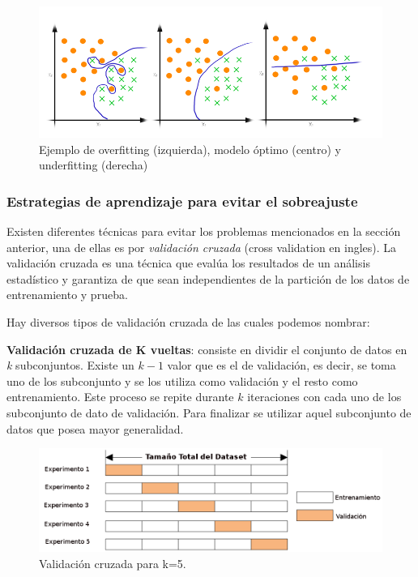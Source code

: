 \begin{figure}[h]
 \centering
  \includegraphics[scale=0.4,keepaspectratio=true,clip=true]{imagenes/MarcoTeorico/OverFUnderF.png}
  \caption{Ejemplo de overfitting (izquierda), modelo óptimo (centro) y underfitting (derecha) }%
	\label{Fig: overUnder}
\end{figure}



\subsubsection{Estrategias de aprendizaje para evitar el sobreajuste}

Existen diferentes técnicas para evitar los problemas mencionados en la sección anterior, una de ellas es por  \textit{validación cruzada} (cross validation en ingles). La validación cruzada es una técnica que evalúa los resultados de un análisis estadístico y garantiza de que sean independientes de la partición de los datos de entrenamiento y prueba. 

Hay diversos tipos de validación cruzada de las cuales podemos nombrar:


\par \textbf{Validación cruzada de K vueltas}: consiste en dividir el conjunto de datos en \textit{k} subconjuntos. Existe un $k-1 $ valor que es el de validación, es decir, se toma uno de los subconjunto y se los utiliza como validación y el resto como entrenamiento.  Este proceso se repite durante $k $ iteraciones con cada uno de los subconjunto de dato de validación. Para finalizar se utilizar aquel subconjunto de datos que posea mayor generalidad.
\begin{figure}[H]
 \centering
  \includegraphics[scale=0.4,keepaspectratio=true,clip=true]{imagenes/MarcoTeorico/crossvalidat.png}
  \caption{Validación cruzada para k=5.}%
	\label{Fig: crossvalidation}
\end{figure}

